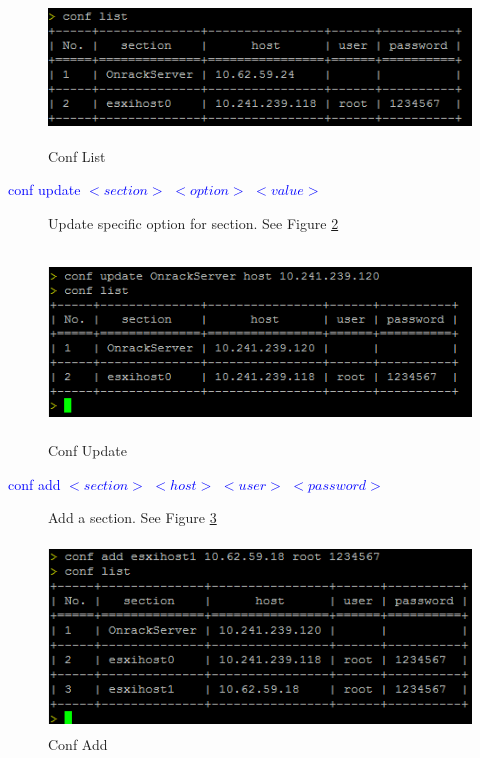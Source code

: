 \documentclass [12pt, a4paper, titlepage]{article}
\begin{document}
        \begin{figure}[H]
        \begin{center}
        \includegraphics[width=13cm,height=4cm]{png/conflist}
        \end{center}
        \caption{Conf List}
        \label{conflist}
        \end{figure}

        \begin{description}
            \item[\textcolor{blue}{conf update $<section>$ $<option>$ $<value>$}] Update specific option for section. See Figure \ref{confupdate}
        \end{description}

        \begin{figure}[H]
        \begin{center}
        \includegraphics[width=13cm,height=5cm]{png/confupdate}
        \end{center}
        \caption{Conf Update}
        \label{confupdate}
        \end{figure}


        \begin{description}
            \item[\textcolor{blue}{conf add $<section>$ $<host>$ $<user>$ $<password>$}] Add a section. See Figure \ref{confadd}
        \end{description}

        \begin{figure}[H]
        \begin{center}
        \includegraphics[width=13cm,height=5cm]{png/confadd}
        \end{center}
        \caption{Conf Add}
        \label{confadd}
        \end{figure}
\end{document}
